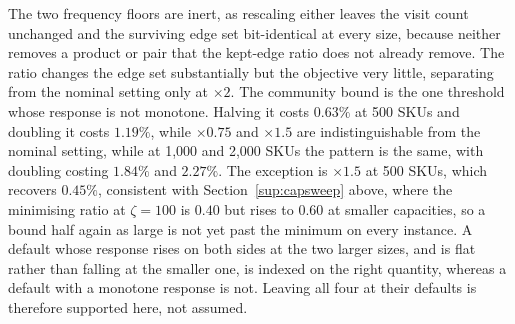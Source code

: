 \documentclass[11pt]{article}
\begin{document}
The two frequency floors are inert, as rescaling either leaves the visit count unchanged and
the surviving edge set bit-identical at every size, because neither removes a product or pair
that the kept-edge ratio does not already remove. The ratio changes the edge set substantially
but the objective very little, separating from the nominal setting only at $\times2$. The
community bound is the one threshold whose response is not monotone. Halving it costs $0.63\%$
at 500 SKUs and doubling it costs $1.19\%$, while $\times0.75$ and $\times1.5$ are
indistinguishable from the nominal setting, while at 1,000 and 2,000 SKUs the pattern is the
same, with doubling costing $1.84\%$ and $2.27\%$. The exception is $\times1.5$ at 500 SKUs,
which recovers $0.45\%$, consistent with Section~\ref{sup:capsweep} above, where the minimising
ratio at $\zeta=100$ is $0.40$ but rises to $0.60$ at smaller capacities, so a bound half again
as large is not yet past the minimum on every instance. A default whose response rises on both
sides at the two larger sizes, and is flat rather than falling at the smaller one, is indexed on
the right quantity, whereas a default with a monotone response is not. Leaving all four at their
defaults is therefore supported here, not assumed.
\end{document}
